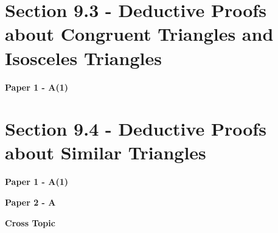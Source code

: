 \documentclass[12pt, a4paper]{article}
\begin{document}
\section*{Section 9.3 - Deductive Proofs about Congruent Triangles and Isosceles Triangles}\label{section:2-9-3}

\textbf{Paper 1 - A(1)}
\begin{enumx}[label=\arabic*.,start=1]
\item {}\label{DSE2013-CoreP1-Q07} 
\item {}\label{DSE2020-CoreP1-Q08} 
\item {}\label{DSE2022-CoreP1-Q08} 
\item {}\label{DSE2024-CoreP1-Q08} 
\end{enumx}




\section*{Section 9.4 - Deductive Proofs about Similar Triangles}\label{section:2-9-4}

\textbf{Paper 1 - A(1)}
\begin{enumx}[label=\arabic*.,start=5]
\item {}\label{DSE2021-CoreP1-Q08} 
\item {}\label{DSE2023-CoreP1-Q08} 
\end{enumx}
\textbf{Paper 2 - A}
\begin{enumx}[label=\arabic*.,start=7]
\item {}\label{DSE2021-CoreP2-Q19} 
\item {}\label{DSE2021-CoreP2-Q20} 
\end{enumx}
\textbf{Cross Topic}
\begin{enumx}[label=\arabic*.,start=9]
\item {}\label{DSE2012S-CoreP1-Q19} 
\item {}\label{DSE2018-CoreP1-Q13} 
\item {}\label{DSE2019-CoreP1-Q14} 
\end{enumx}
\end{document}
